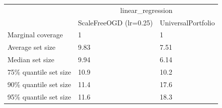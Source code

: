 \begin{tabular}{lll}
\toprule
& \multicolumn{2}{c}{linear_regression} \\
& ScaleFreeOGD (lr=0.25) & UniversalPortfolio \\
\midrule
Marginal coverage & 1 & 1 \\
Average set size & 9.83 & 7.51 \\
Median set size & 9.94 & 6.14 \\
75\% quantile set size & 10.9 & 10.2 \\
90\% quantile set size & 11.4 & 17.6 \\
95\% quantile set size & 11.6 & 18.3 \\
\bottomrule
\end{tabular}
